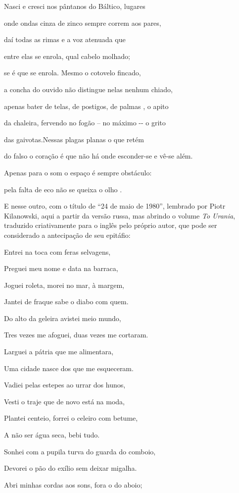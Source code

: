 Nasci e cresci nos pântanos do Báltico, lugares

onde ondas cinza de zinco sempre correm aos pares,

daí todas as rimas e a voz atenuada que

entre elas se enrola, qual cabelo molhado;

se é que se enrola. Mesmo o cotovelo fincado,

a concha do ouvido não distingue nelas nenhum chiado,

apenas bater de telas, de postigos, de palmas , o apito

da chaleira, fervendo no fogão -- no máximo -\/- o grito

das gaivotas.Nessas plagas planas o que retém

do falso o coração é que não há onde esconder-se e vê-se além.

Apenas para o som o espaço é sempre obstáculo:

pela falta de eco não se queixa o olho .

E nesse outro, com o título de ``24 de maio de 1980'', lembrado por
Piotr Kilanowski, aqui a partir da versão russa, mas abrindo o volume
\emph{To Urania}, traduzido criativamente para o inglês pelo próprio
autor, que pode ser considerado a antecipação de seu epitáfio:

Entrei na toca com feras selvagens,

Preguei meu nome e data na barraca,

Joguei roleta, morei no mar, à margem,

Jantei de fraque sabe o diabo com quem.

Do alto da geleira avistei meio mundo,

Tres vezes me afoguei, duas vezes me cortaram.

Larguei a pátria que me alimentara,

Uma cidade nasce dos que me esqueceram.

Vadiei pelas estepes ao urrar dos hunos,

Vesti o traje que de novo está na moda,

Plantei centeio, forrei o celeiro com betume,

A não ser água seca, bebi tudo.

Sonhei com a pupila turva do guarda do comboio,

Devorei o pão do exílio sem deixar migalha.

Abri minhas cordas aos sons, fora o do aboio;

